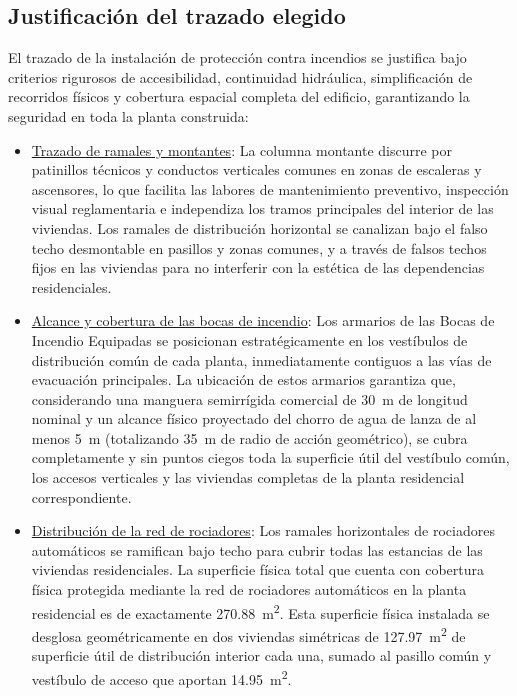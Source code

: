 \documentclass[12pt,a4paper]{article}
\begin{document}
\subsection{Justificación del trazado elegido}

El trazado de la instalación de protección contra incendios se justifica bajo criterios rigurosos de accesibilidad, continuidad hidráulica, simplificación de recorridos físicos y cobertura espacial completa del edificio, garantizando la seguridad en toda la planta construida:
\begin{itemize}
	\item \underline{Trazado de ramales y montantes}: La columna montante discurre por patinillos técnicos y conductos verticales comunes en zonas de escaleras y ascensores, lo que facilita las labores de mantenimiento preventivo, inspección visual reglamentaria e independiza los tramos principales del interior de las viviendas. Los ramales de distribución horizontal se canalizan bajo el falso techo desmontable en pasillos y zonas comunes, y a través de falsos techos fijos en las viviendas para no interferir con la estética de las dependencias residenciales.
	\item \underline{Alcance y cobertura de las bocas de incendio}: Los armarios de las Bocas de Incendio Equipadas se posicionan estratégicamente en los vestíbulos de distribución común de cada planta, inmediatamente contiguos a las vías de evacuación principales. La ubicación de estos armarios garantiza que, considerando una manguera semirrígida comercial de \SI{30}{\meter} de longitud nominal y un alcance físico proyectado del chorro de agua de lanza de al menos \SI{5}{\meter} (totalizando \SI{35}{\meter} de radio de acción geométrico), se cubra completamente y sin puntos ciegos toda la superficie útil del vestíbulo común, los accesos verticales y las viviendas completas de la planta residencial correspondiente.
	\item \underline{Distribución de la red de rociadores}: Los ramales horizontales de rociadores automáticos se ramifican bajo techo para cubrir todas las estancias de las viviendas residenciales. La superficie física total que cuenta con cobertura física protegida mediante la red de rociadores automáticos en la planta residencial es de exactamente \SI{270.88}{\meter\squared}. Esta superficie física instalada se desglosa geométricamente en dos viviendas simétricas de \SI{127.97}{\meter\squared} de superficie útil de distribución interior cada una, sumado al pasillo común y vestíbulo de acceso que aportan \SI{14.95}{\meter\squared}.

\end{itemize}
\end{document}
